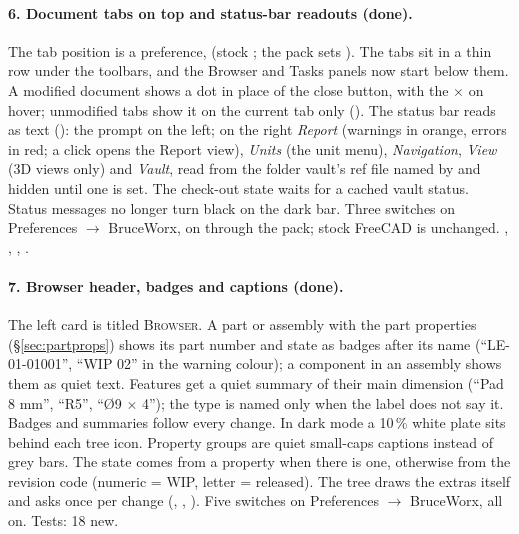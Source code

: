 \paragraph{6. Document tabs on top and status-bar readouts (done).} The tab position is a preference,
 (stock ; the pack sets ). The tabs sit in a thin row under
the toolbars, and the Browser and Tasks panels now start below them. A modified document shows a dot in place of
the close button, with the $\times$ on hover; unmodified tabs show it on the current tab only
(). The status bar reads as text (): the prompt on the
left; on the right \emph{Report} (warnings in orange, errors in red; a click opens the Report view), \emph{Units} (the
unit menu), \emph{Navigation}, \emph{View} (3D views only) and \emph{Vault}, read from the folder vault's ref file named
by  and hidden until one is set. The check-out state waits for a cached vault status.
Status messages no longer turn black on the dark bar. Three switches on Preferences $\rightarrow$ BruceWorx, on
through the pack; stock FreeCAD is unchanged. , ,
, .

\paragraph{7. Browser header, badges and captions (done).} The left card is titled \textsc{Browser}. A part or assembly
with the part properties (\S\ref{sec:partprops}) shows its part number and state as badges after its name
(``LE-01-01001'', ``WIP 02'' in the warning colour); a component in an assembly shows them as quiet text. Features
get a quiet summary of their main dimension (``Pad 8 mm'', ``R5'', ``\O 9 $\times$ 4''); the type is named only when
the label does not say it. Badges and summaries follow every change. In dark mode a 10\,\% white plate sits behind
each tree icon. Property groups are quiet small-caps captions instead of grey bars. The state comes from a
 property when there is one, otherwise from the revision code (numeric = WIP, letter = released). The
tree draws the extras itself and asks  once per change (,
, ). Five switches on Preferences $\rightarrow$
BruceWorx, all on. Tests: 18 new.

